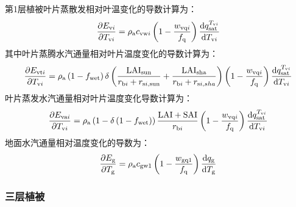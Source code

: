 %
第1层植被叶片蒸散发相对叶温变化的导数计算为：
\begin{equation}
  \frac{\partial E_{\mathrm{v}i}}{\partial T_{\mathrm{v}i}} = \rho_{\mathrm{a}}c_{\mathrm{vw}i}\left( 1 - \frac{w_{\mathrm{vq}i}}{f_{\mathrm{q}}} \right)\frac{{\rm d}q_{\mathrm{sat}}^{T_{\mathrm{v}i}}}{{\rm d}T_{\mathrm{v}i}}
\end{equation}
%
其中叶片蒸腾水汽通量相对叶片温度变化的导数计算为：
\begin{equation}
  \frac{\partial E_{\mathrm{vt}i}}{\partial T_{\mathrm{v}i}} = \rho_{\mathrm{a}}\left( 1 - f_{\mathrm{wet}} \right)\delta\left( \frac{\text{LAI}_{\mathrm{sun}}}{r_{\mathrm{b}i} + r_{\mathrm{s}i,\mathrm{sun}}} + \frac{\text{LAI}_{\mathrm{sha}}}{r_{\mathrm{b}i} + r_{\mathrm{s}i,sha}} \right)\left( 1 - \frac{w_{\mathrm{vq}i}}{f_{\mathrm{q}}} \right)\frac{{\rm d}q_{\mathrm{sat}}^{T_{\mathrm{v}i}}}{{\rm d}T_{\mathrm{v}i}}
\end{equation}
%
叶片蒸发水汽通量相对叶片温度变化导数计算为：
\begin{equation}
  \frac{\partial E_{\mathrm{va}i}}{\partial T_{\mathrm{v}i}} = \rho_{\mathrm{a}}\left( 1 - \delta\left( 1 - f_{\mathrm{wet}} \right) \right)\frac{\text{LAI} + \text{SAI}}{r_{\mathrm{b}i}}\left( 1 - \frac{w_{\mathrm{vq}i}}{f_{\mathrm{q}}} \right)\frac{{\rm d}q_{\mathrm{sat}}^{T_{\mathrm{v}i}}}{{\rm d}T_{\mathrm{v}i}}
\end{equation}
%
地面水汽通量相对温度变化的导数为：
\begin{equation}
  \frac{\partial E_{\mathrm{g}}}{\partial T_{\mathrm{g}}} = \rho_{\mathrm{a}}c_{\mathrm{gw1}}\left( 1 - \frac{w_{\mathrm{gq1}}}{f_{\mathrm {q}}} \right)\frac{{\rm d}q_{\mathrm{g}}}{{\rm d}T_{\mathrm{g}}}
\end{equation}

\subsubsection{三层植被}

